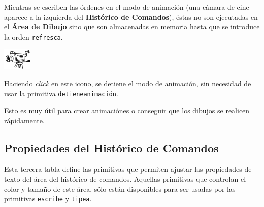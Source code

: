 Mientras se escriben las \'ordenes en el modo de animaci\'on (una c\'amara
de cine aparece a la izquierda del \textbf{Hist\'orico de Comandos}),
\'estas no son ejecutadas en el \textbf{\'Area de Dibujo} sino que son
almacenadas en memoria hasta que se introduce la orden \texttt{refresca}.

\begin{center}
   \includegraphics[scale=2.5]{Imagenes/05_Primitivas/animation.png}
\end{center}
Haciendo \textit{click} en este icono, se detiene el modo de animaci\'on,
sin necesidad de usar la primitiva \texttt{detieneanimaci\'on}.

Esto es muy \'util para crear animaci\'ones o conseguir que los dibujos
se realicen r\'apidamente.

\subsection{Propiedades del Hist\'orico de Comandos}
   \label{Propiedades-Historico}

Esta tercera tabla define las primitivas que permiten ajustar las
propiedades de texto del \'area del hist\'orico de comandos. Aquellas
primitivas que controlan el color y tama\~no de este \'area, s\'olo est\'an
disponibles para ser usadas por las primitivas \texttt{escribe} y
\texttt{tipea}.

